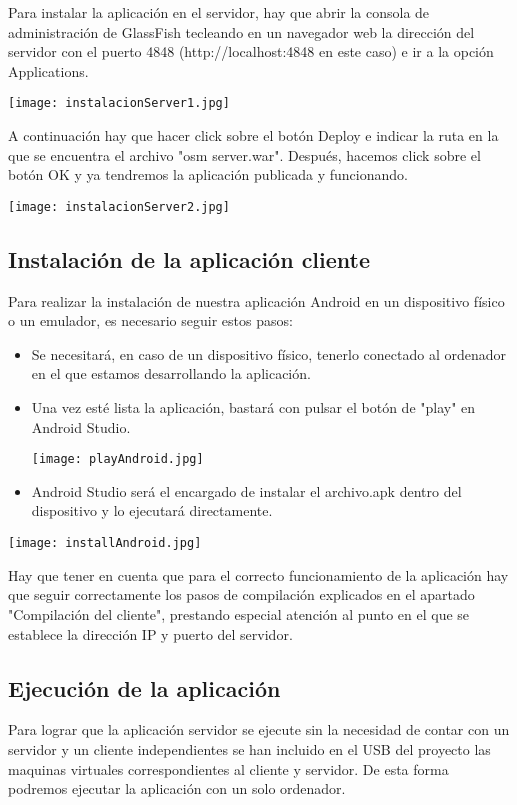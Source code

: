 Para instalar la aplicación en el servidor, hay que abrir la consola de administración de GlassFish tecleando en un navegador web la dirección del servidor con el puerto 4848 (http://localhost:4848 en este caso) e ir a la opción Applications.

\texttt{[image: instalacionServer1.jpg]}

A continuación hay que hacer click sobre el botón Deploy e indicar la ruta en la que se encuentra el archivo "osm server.war". Después, hacemos click sobre el botón OK y ya tendremos la aplicación publicada y funcionando.

\texttt{[image: instalacionServer2.jpg]}

\subsection{Instalación de la aplicación cliente}

Para realizar la instalación de nuestra aplicación Android en un dispositivo físico o un emulador, es necesario seguir estos pasos:

\begin{itemize}
\item Se necesitará, en caso de un dispositivo físico, tenerlo conectado al ordenador en el que estamos desarrollando la aplicación.
\item Una vez esté lista la aplicación, bastará con pulsar el botón de "play" en Android Studio.

\texttt{[image: playAndroid.jpg]}

\item Android Studio será el encargado de instalar el archivo.apk dentro del dispositivo y lo ejecutará directamente.
\end{itemize}

\texttt{[image: installAndroid.jpg]}

Hay que tener en cuenta que para el correcto funcionamiento de la aplicación hay que seguir correctamente los pasos de compilación explicados en el apartado "Compilación del cliente", prestando especial atención al punto en el que se establece la dirección IP y puerto del servidor.

\subsection{Ejecución de la aplicación}

Para lograr que la aplicación servidor se ejecute sin la necesidad de contar con un servidor y un cliente independientes se han incluido en el USB del proyecto las maquinas virtuales correspondientes al cliente y servidor. De esta forma podremos ejecutar la aplicación con un solo ordenador.

